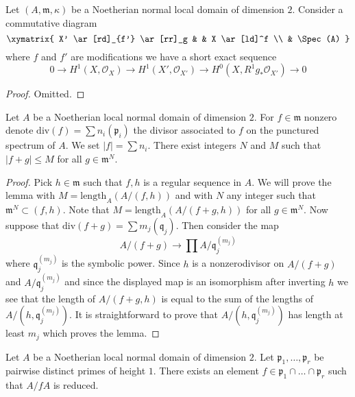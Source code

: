 \begin{lemma}
\label{lemma-exact-sequence}
Let $(A, \mathfrak m, \kappa)$ be a Noetherian normal local domain
of dimension $2$. Consider a commutative diagram
$$
\xymatrix{
X' \ar[rd]_{f'} \ar[rr]_g & & X \ar[ld]^f \\
& \Spec(A)
}
$$
where $f$ and $f'$ are modifications we have
a short exact sequence
$$
0 \to H^1(X, \mathcal{O}_X) \to H^1(X', \mathcal{O}_{X'}) \to
H^0(X, R^1g_*\mathcal{O}_{X'}) \to 0
$$
\end{lemma}

\begin{proof}
Omitted.
\end{proof}

\begin{lemma}
\label{lemma-bound-primes}
Let $A$ be a Noetherian local normal domain of dimension $2$.
For $f \in \mathfrak m$ nonzero denote
$\text{div}(f) = \sum n_i (\mathfrak p_i)$
the divisor associated to $f$ on the punctured spectrum of $A$.
We set $|f| = \sum n_i$. There exist integers $N$ and $M$
such that $|f + g| \leq M$ for all $g \in \mathfrak m^N$.
\end{lemma}

\begin{proof}
Pick $h \in \mathfrak m$ such that $f, h$ is a regular sequence in $A$.
We will prove the lemma with $M = \text{length}_A(A/(f, h))$ and with
$N$ any integer such that $\mathfrak m^N \subset (f, h)$. Note that
$M = \text{length}_A(A/(f + g, h))$ for all $g \in \mathfrak m^N$.
Now suppose that $\text{div}(f + g ) = \sum m_j (\mathfrak q_j)$.
Then consider the map
$$
A/(f + g) \longrightarrow \prod A/\mathfrak q_j^{(m_j)}
$$
where $\mathfrak q_j^{(m_j)}$ is the symbolic power. Since $h$ is a
nonzerodivisor on $A/(f + g)$ and $A/\mathfrak q_j^{(m_j)}$ and since
the displayed map is an isomorphism after inverting $h$ we see that
the length of $A/(f + g, h)$ is equal to the sum of the lengths of
$A/(h, \mathfrak q_j^{(m_j)})$. It is straightforward to prove
that $A/(h, \mathfrak q_j^{(m_j)})$ has length at least $m_j$
which proves the lemma.
\end{proof}

\begin{lemma}
\label{lemma-radical-element}
Let $A$ be a Noetherian local normal domain of dimension $2$.
Let $\mathfrak p_1, \ldots, \mathfrak p_r$ be pairwise distinct
primes of height $1$. There exists an element
$f \in \mathfrak p_1 \cap \ldots \cap \mathfrak p_r$ such
that $A/fA$ is reduced.
\end{lemma}

